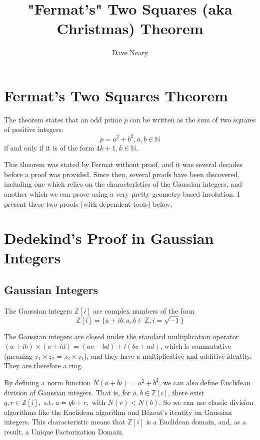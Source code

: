 \documentclass{article}
\begin{document}
\title{"Fermat's" Two Squares (aka Christmas) Theorem}
\author{Dave Neary}

\maketitle

\section{Fermat's Two Squares Theorem}

The theorem states that an odd prime $p$ can be written as the sum of two squares of
positive integers:
\[ p = a^2 + b^2 , a, b \in \mathbb{N} \]
if and only if it is of the form $4k+1, k\in \mathbb{N}$.

This theorem was stated by Fermat without proof, and it was several decades before a proof
was provided. Since then, several proofs have been discovered, including one which relies 
on the characteristics of the Gaussian integers, and another which we can prove using a
very pretty geometry-based involution. I present these two proofs (with dependent tools)
below.

\section{Dedekind's Proof in Gaussian Integers}

\subsection{Gaussian Integers}

The Gaussian integers $\mathbb{Z}[i]$ are complex numbers of the form 
\[ \mathbb{Z}[i] = \{a+ib:a,b\in \mathbb{Z}, i=\sqrt{-1}\}\]

The Gaussian integers are closed under the standard multiplication operator
$(a+ib) \times (c+id) = (ac-bd) + i(bc+ad)$, which is commutative (meaning
$z_1 \times z_2 = z_2 \times z_1$), and they have a multiplicative and additive
identity. They are therefore a ring.

By defining a norm function $N(a+bi) = a^2+b^2$, we can also define Euclidean division of
Gaussian integers. That is, for $a,b \in \mathbb{Z}[i]$, there exist $q,r \in \mathbb{Z}[i],
\text{ s.t. } a=qb+r, \text{ with } N(r)<N(b)$. So we can use classic division
algorithms like  the Euclidean algorithm and Bézout's itentity on Gaussian integers. This
characteristic means that $\mathbb{Z}[i]$ is a Euclidean domain, and, as a result, a Unique
Factorization Domain.
\end{document}
